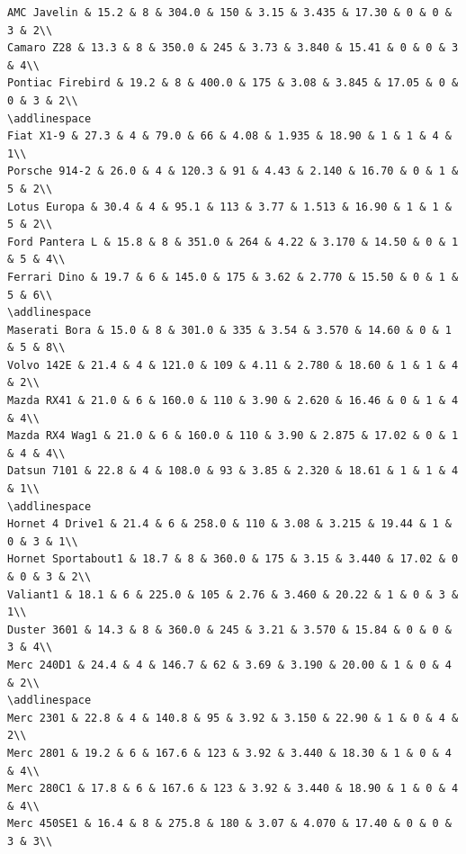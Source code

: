 \documentclass[a4paper, nobind]{templates/ociamthesis}
\begin{document}
\begin{verbatim}
AMC Javelin & 15.2 & 8 & 304.0 & 150 & 3.15 & 3.435 & 17.30 & 0 & 0 & 3 & 2\\
Camaro Z28 & 13.3 & 8 & 350.0 & 245 & 3.73 & 3.840 & 15.41 & 0 & 0 & 3 & 4\\
Pontiac Firebird & 19.2 & 8 & 400.0 & 175 & 3.08 & 3.845 & 17.05 & 0 & 0 & 3 & 2\\
\addlinespace
Fiat X1-9 & 27.3 & 4 & 79.0 & 66 & 4.08 & 1.935 & 18.90 & 1 & 1 & 4 & 1\\
Porsche 914-2 & 26.0 & 4 & 120.3 & 91 & 4.43 & 2.140 & 16.70 & 0 & 1 & 5 & 2\\
Lotus Europa & 30.4 & 4 & 95.1 & 113 & 3.77 & 1.513 & 16.90 & 1 & 1 & 5 & 2\\
Ford Pantera L & 15.8 & 8 & 351.0 & 264 & 4.22 & 3.170 & 14.50 & 0 & 1 & 5 & 4\\
Ferrari Dino & 19.7 & 6 & 145.0 & 175 & 3.62 & 2.770 & 15.50 & 0 & 1 & 5 & 6\\
\addlinespace
Maserati Bora & 15.0 & 8 & 301.0 & 335 & 3.54 & 3.570 & 14.60 & 0 & 1 & 5 & 8\\
Volvo 142E & 21.4 & 4 & 121.0 & 109 & 4.11 & 2.780 & 18.60 & 1 & 1 & 4 & 2\\
Mazda RX41 & 21.0 & 6 & 160.0 & 110 & 3.90 & 2.620 & 16.46 & 0 & 1 & 4 & 4\\
Mazda RX4 Wag1 & 21.0 & 6 & 160.0 & 110 & 3.90 & 2.875 & 17.02 & 0 & 1 & 4 & 4\\
Datsun 7101 & 22.8 & 4 & 108.0 & 93 & 3.85 & 2.320 & 18.61 & 1 & 1 & 4 & 1\\
\addlinespace
Hornet 4 Drive1 & 21.4 & 6 & 258.0 & 110 & 3.08 & 3.215 & 19.44 & 1 & 0 & 3 & 1\\
Hornet Sportabout1 & 18.7 & 8 & 360.0 & 175 & 3.15 & 3.440 & 17.02 & 0 & 0 & 3 & 2\\
Valiant1 & 18.1 & 6 & 225.0 & 105 & 2.76 & 3.460 & 20.22 & 1 & 0 & 3 & 1\\
Duster 3601 & 14.3 & 8 & 360.0 & 245 & 3.21 & 3.570 & 15.84 & 0 & 0 & 3 & 4\\
Merc 240D1 & 24.4 & 4 & 146.7 & 62 & 3.69 & 3.190 & 20.00 & 1 & 0 & 4 & 2\\
\addlinespace
Merc 2301 & 22.8 & 4 & 140.8 & 95 & 3.92 & 3.150 & 22.90 & 1 & 0 & 4 & 2\\
Merc 2801 & 19.2 & 6 & 167.6 & 123 & 3.92 & 3.440 & 18.30 & 1 & 0 & 4 & 4\\
Merc 280C1 & 17.8 & 6 & 167.6 & 123 & 3.92 & 3.440 & 18.90 & 1 & 0 & 4 & 4\\
Merc 450SE1 & 16.4 & 8 & 275.8 & 180 & 3.07 & 4.070 & 17.40 & 0 & 0 & 3 & 3\\

\end{verbatim}
\end{document}
